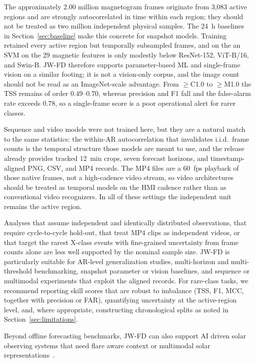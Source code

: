 \documentclass[universe,article,submit,moreauthors]{Definitions/mdpi}
\newif\ifrevision
\newcommand{\add}[1]{\ifrevision\textcolor{blue}{#1}\else#1\fi}
\newcommand{\del}[1]{\ifrevision\textcolor{red}{\sout{#1}}\else\fi}
\newcommand{\chg}[2]{\del{#1}\add{#2}}
\begin{document}
The approximately 2.00 million magnetogram frames originate from 3{,}083 active regions and are strongly autocorrelated in time within each region; they should not be treated as two million independent physical samples. The 24~h baselines in Section~\ref{sec:baseline} make this concrete for snapshot models. Training retained every active region but temporally subsampled frames, and on the \chg{seed-62 AR-level test set}{seed~3970 AR-level test set} an SVM on the 29 magnetic features is only modestly below ResNet-152, ViT-B/16, and Swin-B. JW-FD therefore supports parameter-based ML and single-frame vision on a similar footing; it is not a vision-only corpus, and the image count should not be read as an ImageNet-scale advantage. From $\geq$C1.0 to $\geq$M1.0 the TSS remains of order $0.49$--$0.70$, whereas precision and F1 fall and the false-alarm rate exceeds $0.78$, so a single-frame score is a poor operational alert for rarer classes.

Sequence and video models were not trained here, but they are a natural match to the same statistics: the within-AR autocorrelation that invalidates i.i.d.\ frame counts is the temporal structure those models are meant to use, and the release already provides tracked 12~min crops, seven forecast horizons, and timestamp-aligned PNG, CSV, and MP4 records. The MP4 files are a 60~fps playback of those native frames, not a high-cadence video stream, so video architectures should be treated as temporal models on the HMI cadence rather than as conventional video recognizers. In all of these settings the independent unit remains the active region.

Analyses that assume independent and identically distributed observations, that require cycle-to-cycle hold-out, that treat MP4 clips as independent videos, or that target the rarest X-class events with fine-grained uncertainty from frame counts alone are less well supported by the nominal sample size. JW-FD is particularly suitable for AR-level generalization studies, multi-horizon and multi-threshold benchmarking, snapshot parameter or vision baselines, and sequence or multimodal experiments that exploit the aligned records. For rare-class tasks, we recommend reporting skill scores that are robust to imbalance (TSS, F1, MCC, together with precision or FAR), quantifying uncertainty at the active-region level, and, where appropriate, constructing chronological splits as noted in Section~\ref{sec:limitations}.

Beyond offline forecasting benchmarks, JW-FD can also support AI driven solar observing systems that need flare aware context or multimodal solar representations~\cite{Lin2026sidest,Tong2026astclaw,Tong2026aims}.
\end{document}
